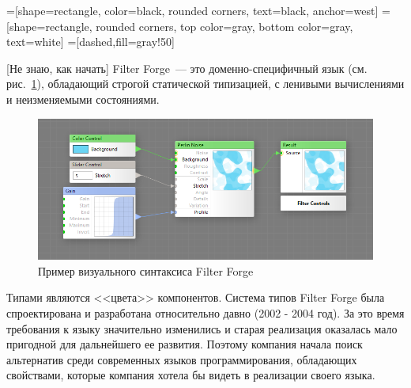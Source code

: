 


    =[shape=rectangle, color=black, rounded corners,%
    text=black, anchor=west]
    =[shape=rectangle, rounded corners,%
    top color=gray,%
    bottom color=gray, text=white]
    =[dashed,fill=gray!50]



\Intro
[Не знаю, как начать] Filter Forge~--- это доменно-специфичный язык (см. рис.~\ref{forge}), обладающий строгой статической типизацией, с ленивыми вычислениями и неизменяемыми состояниями.
\begin{figure}
	\centering
	\includegraphics[width=\textwidth]{img/forge.png}
	\caption{Пример визуального синтаксиса Filter Forge}\label{forge}
\end{figure}
 Типами являются <<цвета>> компонентов. Система типов Filter Forge была спроектирована и разработана относительно давно (2002 - 2004 год). За это время требования к языку значительно изменились и старая реализация оказалась мало пригодной для дальнейшего ее развития. Поэтому компания начала поиск альтернатив среди современных языков программирования, обладающих свойствами, которые компания хотела бы видеть в реализации своего языка.

